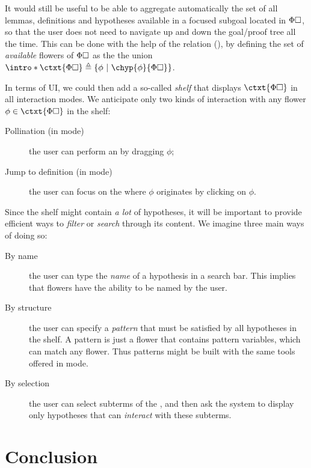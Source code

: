 \begin{scope}
\AP
It would still be useful to be able to aggregate automatically the set of all
lemmas, definitions and hypotheses available in a focused subgoal located in
$\Phi\square$, so that the user does not need to navigate up and down the
goal/proof tree all the time. This can be done with the help of the
 relation (), by defining the set of
\emph{available} flowers of $\Phi\square$ as the the union
$\intro*\ctxt{\Phi\hole} \defeq \compr{\phi}{\chyp{\phi}{\Phi\hole}}$.

In terms of UI, we could then add a so-called \emph{shelf} that displays
$\ctxt{\Phi\hole}$ in all interaction modes. We anticipate only two kinds of
interaction with any flower $\phi \in \ctxt{\Phi\hole}$ in the shelf:
\begin{description}
  \item[Pollination (in  mode)] the user can perform an
    by dragging $\phi$;
  \item[Jump to definition (in  mode)] the user can focus on
  the  where $\phi$ originates by clicking on $\phi$.
\end{description}

Since the shelf might contain \emph{a lot} of hypotheses, it will be important
to provide efficient ways to \emph{filter} or \emph{search} through its content.
We imagine three main ways of doing so:
\begin{description}
  \item[By name] the user can type the \emph{name} of a hypothesis in a
  search bar. This implies that flowers have the ability to be named by the
  user.
  \item[By structure] the user can specify a \emph{pattern} that must
  be satisfied by all hypotheses in the shelf. A pattern is just a flower that
  contains pattern variables, which can match any flower. Thus patterns might be
  built with the same tools offered in  mode.
  \item[By selection] the user can select subterms of the , and then
  ask the system to display only hypotheses that can \emph{interact} with these
  subterms.
\end{description}


\section{Conclusion}


\end{scope}
